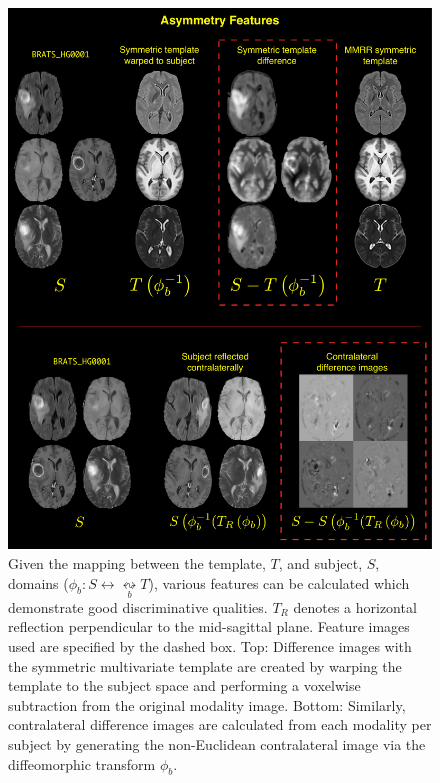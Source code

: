 \documentclass[preprint,authoryear,review,12pt]{elsarticle}
\begin{document}
\begin{figure}
  \centering
    \includegraphics[width=120mm]{asymmetryFeatureImages.pdf}
  \caption{ Given the mapping between the template, $T$, and subject, $S$, domains ($\phi_b: S  \leftrightarrow \underset{b}{\leftrightsquigarrow} T$), various features can be calculated which demonstrate good discriminative qualities.  $T_R$ denotes a horizontal reflection
  perpendicular to the mid-sagittal plane.
  Feature images used are specified by the dashed box.
Top:  Difference images with the symmetric multivariate template are created by warping the template to the subject space and performing a voxelwise subtraction from the original modality image.
Bottom:  Similarly, contralateral difference images are calculated from each modality per subject by generating the non-Euclidean contralateral image via the diffeomorphic transform $\phi_b$.  
          }
  \label{fig:asymmetryFeatures}
\end{figure}
\end{document}
